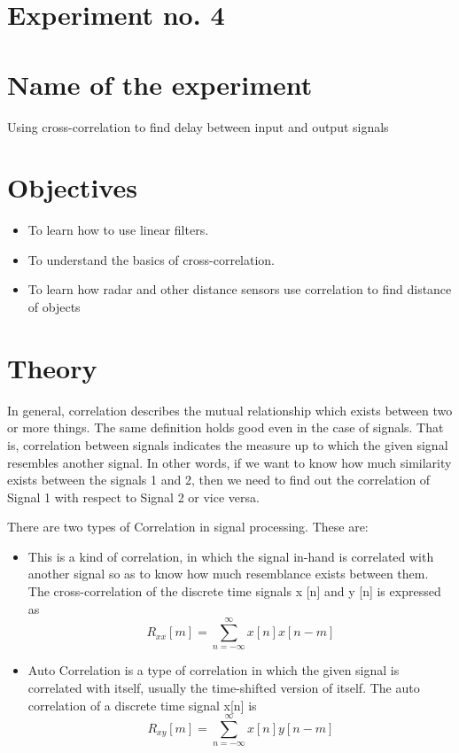 \documentclass[a4paper,11pt]{article}
\begin{document}
	\section*{Experiment no. 4}
	\section*{Name of the experiment}
	Using cross-correlation to find delay between input and output signals
	\section*{Objectives}
	\begin{itemize}
		\item To learn how to use linear filters. 
		\item To understand the basics of cross-correlation.
		\item To learn how radar and other distance sensors use correlation to find distance of objects
		
	\end{itemize}
	\section*{Theory}
	In general, correlation describes the mutual relationship which exists between two or more things. The same definition holds good even in the case of signals. That is, correlation between signals indicates the measure up to which the given signal resembles another signal. In other words, if we want to know how much similarity exists between the signals 1 and 2, then we need to find out the correlation of Signal 1 with respect to Signal 2 or vice versa.
	
	There are two types of Correlation in signal processing. These are:\\
	\begin{itemize}
		\item This is a kind of correlation, in which the signal in-hand is correlated with another signal so as to know how much resemblance exists between them. The cross-correlation of the discrete time signals x [n] and y [n] is expressed as
		$$ R_{xx}[m]= \sum_{n=-\infty}^{\infty}x[n]x[n-m] $$
		\item Auto Correlation is a type of correlation in which the given signal is correlated with itself, usually the time-shifted version of itself.
		The auto correlation of a discrete time signal x[n] is
		$$ R_{xy}[m]= \sum_{n=-\infty}^{\infty}x[n]y[n-m] $$
	\end{itemize}
\end{document}
